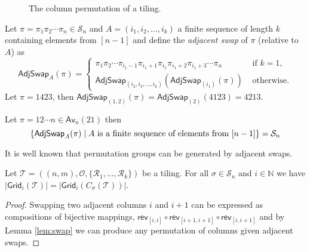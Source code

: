 \begin{figure}[ht!]
    \centering
    
    \caption{The column permutation of a tiling.}
    \label{fig:t_col_perm}
\end{figure}

Let $\pi=\pi_1\pi_2 \dotsm \pi_n \in\mathcal{S}_n$ and $A = (i_1, i_2,\dotsc,i_k)$ a finite sequence of length $k$ containing elements from $[n-1]$ and define the \emph{adjacent swap} of $\pi$ (relative to $A$) as
\[
\textsf{AdjSwap}_{A}(\pi) = \begin{cases}
\pi_1\pi_2 \dotsm \pi_{i_1-1}\pi_{i_1+1}\pi_{i_1}\pi_{i_1+2}\pi_{i_1+3} \dotsm \pi_n & \mbox{ if } k = 1,\\
\textsf{AdjSwap}_{(i_2,i_3,\dotsc,i_k)}\left(\textsf{AdjSwap}_{(i_1)}(\pi)\right) & \mbox{ otherwise.}
\end{cases}
\]
Let $\pi = 1423$, then $\textsf{AdjSwap}_{(1,2)}(\pi) = \textsf{AdjSwap}_{(2)}(4123) = 4213$.

\begin{lemma}\label{lem:swap}
Let $\pi = 12\dotsm n \in \textsf{Av}_n(21)$ then
\[
    \left\{\textsf{AdjSwap}_A(\pi) \mid A \text{ is a finite sequence of elements from } [n-1]\right\} = \mathcal{S}_n
\]
\end{lemma}
It is well known that permutation groups can be generated by adjacent swaps.

\begin{comment}\begin{proof}
Suppose we can generate $\mathcal{S}_{n-1}$ this way from the permutation in $\textsf{Av}_{n-1}(21)$ and let $\pi = \pi_1 \pi_2 \dotsm \pi_n \in \mathcal{S}_n$ with $\pi_j = n$. Let $A = (i_1,i_2,\dotsc,i_k)$ be the sequence of swaps that turns $12\dotsm (n-1)$ into $\pi_1 \pi_2 \dotsm \pi_{j-1}\pi_{j+1}\dotsm \pi_n \in \mathcal{S}_{n-1}$, then
\begin{align*}
    \textsf{AdjSwap}_{(i_1,i_2,\dotsc,i_k, n-1, n-2,\dotsc,j)}(12\dotsm n) = \pi
\end{align*}
and since this holds for a base case, it holds for all lengths $n\in\N$.
\end{proof}\end{comment}

\begin{proposition}
Let $\mathcal{T} = ((n,m),\mathcal{O},\{\mathcal{R}_1,\dotsc,\mathcal{R}_k\})$ be a tiling. For all $\sigma\in\mathcal{S}_n$ and $i\in\mathbb{N}$ we have $|\textsf{Grid}_i(\mathcal{T})| = |\textsf{Grid}_i\left(C_\sigma(\mathcal{T})\right)|$.
\end{proposition}
\begin{proof}
Swapping two adjacent columns $i$ and $i+1$ can be expressed as compositions of bijective mappings, $\textsf{rev}_{[i,i]} \circ \textsf{rev}_{[i+1,i+1]} \circ \textsf{rev}_{[i,i+1]}$ and by Lemma \ref{lem:swap} we can produce any permutation of columns given adjacent swaps.
\end{proof}